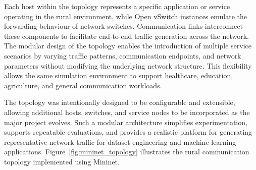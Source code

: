 \documentclass[12pt,a4paper]{report}
\begin{document}
	Each host within the topology represents a specific application or service operating in the rural environment, while Open vSwitch instances emulate the forwarding behaviour of network switches. Communication links interconnect these components to facilitate end-to-end traffic generation across the network. The modular design of the topology enables the introduction of multiple service scenarios by varying traffic patterns, communication endpoints, and network parameters without modifying the underlying network structure. This flexibility allows the same simulation environment to support healthcare, education, agriculture, and general communication workloads.
	
	The topology was intentionally designed to be configurable and extensible, allowing additional hosts, switches, and service nodes to be incorporated as the major project evolves. Such a modular architecture simplifies experimentation, supports repeatable evaluations, and provides a realistic platform for generating representative network traffic for dataset engineering and machine learning applications. Figure~\ref{fig:mininet_topology} illustrates the rural communication topology implemented using Mininet.
	
\end{document}
